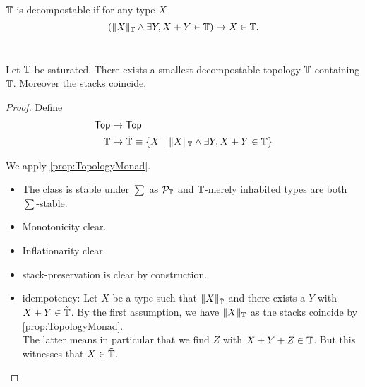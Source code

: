 \begin{definition}
	$\mathbb{T}$ is decompostable if for any type $X$
	\[ \left(\|X\|_{\mathbb{T}} \land \exists Y , X + Y \in \mathbb{T}  \right) \to X \in \mathbb{T}. \]\\ 

\end{definition}

\begin{prop}
	Let $\mathbb{T}$ be saturated. There exists a smallest decompostable topology $\tilde {\mathbb{T}}$ containing $\mathbb{T}$. Moreover the stacks coincide.	
\end{prop}
\begin{proof}
	Define
\begin{align*}
	\Top &\to \Top \\
	\bT &\mapsto \tilde \bT \equiv \{X \ | \ \|X\|_{\bT} \land \exists Y , X + Y \in \bT \} %
\end{align*}

	We apply \ref{prop:TopologyMonad}.
	\begin{itemize}
		\item 	The class is stable under $\sum$  as $\mathcal{P}_{\mathbb{T}}$ and $\mathbb{T}$-merely inhabited types are both  $\sum$-stable. \\
		\item Monotonicity clear.
		\item Inflationarity clear
		\item stack-preservation is clear by construction.
	\item idempotency: %
Let $X$ be a type such that $\|X\|_{\tilde {\mathbb{T}}}$ and there exists a $Y$  with $X + Y \in \tilde {\mathbb{T}}$. By the first assumption, we have $\|X\|_{\mathbb{T}}$ as the stacks coincide by \ref{prop:TopologyMonad}. \\
The latter means in particular that we find $Z$ with $X + Y + Z \in \mathbb{T}$. But this witnesses that $X  \in \tilde {\mathbb{T}}$.		
\end{itemize}

\end{proof}




